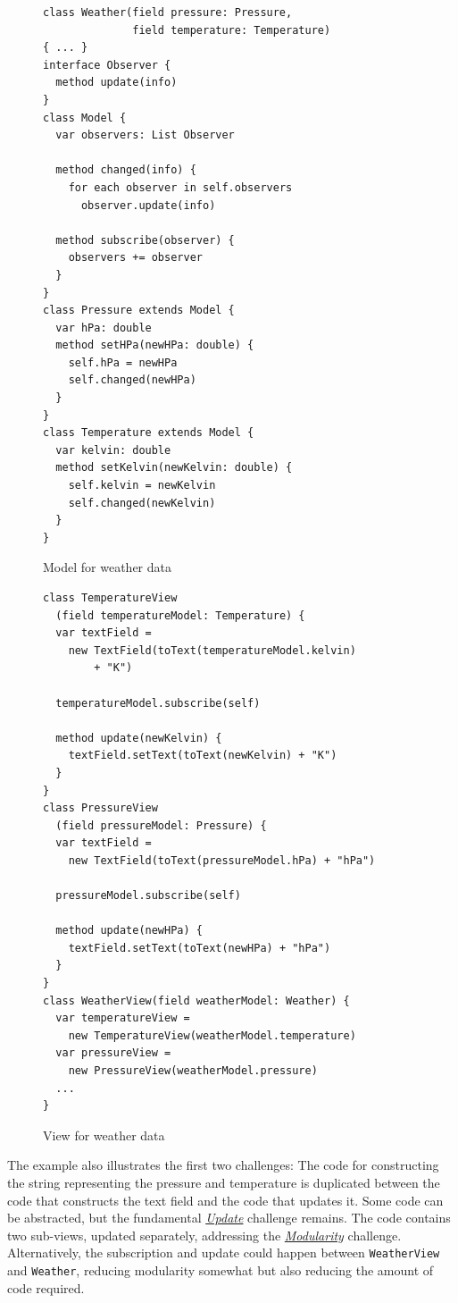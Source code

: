 \documentclass[sigplan,screen]{acmart}
\begin{document}
\begin{figure}[tb]
\begin{verbatim}
class Weather(field pressure: Pressure,
              field temperature: Temperature)
{ ... }
interface Observer {
  method update(info)
}
class Model {
  var observers: List Observer

  method changed(info) {
    for each observer in self.observers
      observer.update(info)

  method subscribe(observer) {
    observers += observer
  }
}
class Pressure extends Model {
  var hPa: double
  method setHPa(newHPa: double) {
    self.hPa = newHPa
    self.changed(newHPa)
  }
}
class Temperature extends Model {
  var kelvin: double
  method setKelvin(newKelvin: double) {
    self.kelvin = newKelvin
    self.changed(newKelvin)
  }
}
\end{verbatim}
  \vspace*{-3ex}
  \caption{Model for weather data}
  \label{fig:weather-model}
\end{figure}

\begin{figure}[tb]
\begin{verbatim}
class TemperatureView
  (field temperatureModel: Temperature) {
  var textField =
    new TextField(toText(temperatureModel.kelvin)
        + "K")

  temperatureModel.subscribe(self)

  method update(newKelvin) {
    textField.setText(toText(newKelvin) + "K")
  }
}
class PressureView
  (field pressureModel: Pressure) {
  var textField =
    new TextField(toText(pressureModel.hPa) + "hPa")

  pressureModel.subscribe(self)

  method update(newHPa) {
    textField.setText(toText(newHPa) + "hPa")
  }
}
class WeatherView(field weatherModel: Weather) {
  var temperatureView =
    new TemperatureView(weatherModel.temperature)
  var pressureView =
    new PressureView(weatherModel.pressure)
  ...
}
\end{verbatim}
  \vspace*{-2ex}
  \caption{View for weather data}
  \label{fig:weather-view}
\end{figure}

The example also illustrates the first two challenges:
The code for constructing the string representing the pressure
and temperature is duplicated between the code that constructs the
text field and the code that updates it.  Some code can be abstracted,
but the fundamental
\hyperlink{challenge:update}{\textit{Update}} challenge remains.
The code contains two sub-views, updated separately, addressing the
\hyperlink{challenge:modularity}{\textit{Modularity}} challenge.
Alternatively, the subscription and update could happen between
\texttt{WeatherView} and \texttt{Weather}, reducing modularity
somewhat but also reducing the amount of code required.
\end{document}
